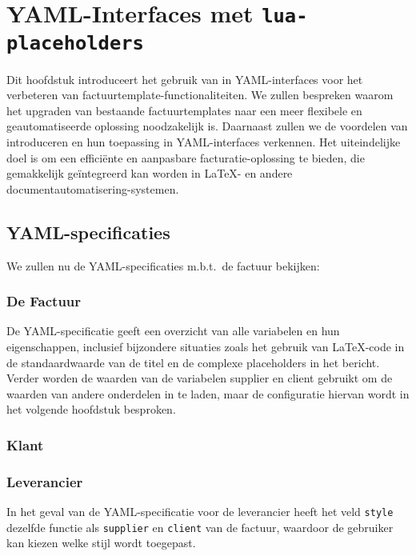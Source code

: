 \section{YAML-Interfaces met \texttt{lua-placeholders}}
Dit hoofdstuk introduceert het gebruik van  in YAML-interfaces voor het verbeteren van factuur\-template-functionaliteiten.
We zullen bespreken waarom het upgraden van bestaande factuurtemplates naar een meer flexibele en geautomatiseerde oplossing noodzakelijk is.
Daarnaast zullen we de voordelen van  introduceren en hun toepassing in YAML-interfaces verkennen.
Het uiteindelijke doel is om een efficiënte en aanpasbare facturatie-oplossing te bieden, die gemakkelijk geïntegreerd kan worden in \LaTeX- en andere documentautomatisering-systemen.

\subsection{YAML-specificaties}
We zullen nu de YAML-specificaties m.b.t.\ de factuur bekijken:

\subsubsection{De Factuur}

De YAML-specificatie geeft een overzicht van alle variabelen en hun eigenschappen, inclusief bijzondere situaties zoals het gebruik van LaTeX-code in de standaardwaarde van de titel en de complexe placeholders in het bericht.
Verder worden de waarden van de variabelen supplier en client gebruikt om de waarden van andere onderdelen in te laden, maar de configuratie hiervan wordt in het volgende hoofdstuk besproken.

\subsubsection{Klant}


\subsubsection{Leverancier}

In het geval van de YAML-specificatie voor de leverancier heeft het veld \texttt{style} dezelfde functie als \texttt{supplier} en \texttt{client} van de factuur, waardoor de gebruiker kan kiezen welke stijl wordt toegepast.

